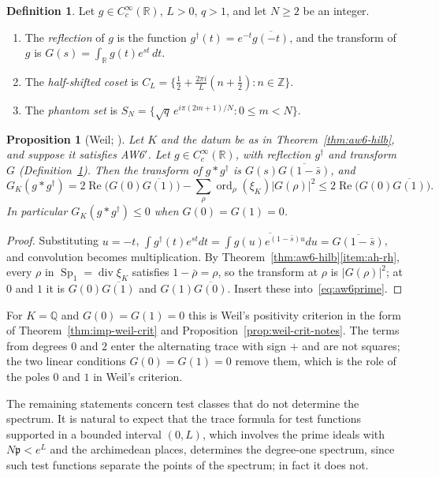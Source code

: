 \documentclass[11pt]{amsart}
\theoremstyle{plain}
\newtheorem{proposition}[theorem]{Proposition}
\theoremstyle{definition}
\newtheorem{definition}[theorem]{Definition}
\theoremstyle{remark}
\numberwithin{equation}{section}
\newcommand{\R}{\mathbb{R}}
\newcommand{\Q}{\mathbb{Q}}
\newcommand{\Z}{\mathbb{Z}}
\DeclareMathOperator{\divisor}{div}
\DeclareMathOperator{\Rea}{Re}
\DeclareMathOperator{\ord}{ord}
\renewcommand{\Re}{\Rea}
\begin{document}
\begin{definition}\label{def:window-objects}
Let $g\in C_c^\infty(\R)$, $L>0$, $q>1$, and let $N\ge2$ be an integer.
\begin{enumerate}[label=(\alph*)]
\item The \emph{reflection} of $g$ is the function
  $g^\dagger(t)=e^{-t}\overline{g(-t)}$, and the transform of $g$ is
  $G(s)=\int_\R g(t)e^{st}\,dt$.
\item The \emph{half-shifted coset} is
  $C_L=\{\tfrac12+\tfrac{2\pi i}L(n+\tfrac12):n\in\Z\}$.
\item The \emph{phantom set} is
  $S_N=\{\sqrt q\,e^{i\pi(2m+1)/N}:0\le m<N\}$.
\end{enumerate}
\end{definition}

\begin{proposition}[{Weil; \cite[\S V, p.~9]{Bombieri2000Clay}}]%
\label{prop:aw6-weil-pos}
Let $K$ and the datum be as in Theorem~\ref{thm:aw6-hilb}, and suppose
it satisfies AW6$'$. Let $g\in C_c^\infty(\R)$, with reflection
$g^\dagger$ and transform $G$ (Definition~\ref{def:window-objects}).
Then the transform of $g*g^\dagger$ is $G(s)\overline{G(1-\bar s)}$,
and
\[
G_K(g*g^\dagger)=2\Re\bigl(G(0)\overline{G(1)}\bigr)
-\sum_\rho\ord_\rho(\xi_K)|G(\rho)|^2
\le2\Re\bigl(G(0)\overline{G(1)}\bigr).
\]
In particular $G_K(g*g^\dagger)\le0$ when $G(0)=G(1)=0$.
\end{proposition}

\begin{proof}
Substituting $u=-t$, $\int g^\dagger(t)e^{st}dt=\overline{\int
g(u)e^{(1-\bar s)u}du}=\overline{G(1-\bar s)}$, and convolution becomes
multiplication. By Theorem~\ref{thm:aw6-hilb}\ref{item:ah-rh}, every
$\rho$ in $\operatorname{Sp}_1=\divisor\xi_K$ satisfies
$1-\bar\rho=\rho$, so the transform at $\rho$ is $|G(\rho)|^2$; at $0$
and $1$ it is $G(0)\overline{G(1)}$ and $G(1)\overline{G(0)}$.
Insert these into~\eqref{eq:aw6prime}.
\end{proof}

For $K=\Q$ and $G(0)=G(1)=0$ this is Weil's positivity criterion in the
form of Theorem~\ref{thm:imp-weil-crit} and
Proposition~\ref{prop:weil-crit-notes}. The terms from degrees $0$ and
$2$ enter the alternating trace with sign $+$ and are not squares; the
two linear conditions $G(0)=G(1)=0$ remove them, which is the role of
the poles $0$ and $1$ in Weil's criterion.

\medskip
The remaining statements concern test classes that do not determine
the spectrum. It is natural to expect that the trace formula for test
functions supported in a bounded interval $(0,L)$, which involves the
prime ideals with $N\mathfrak p<e^L$ and the archimedean places,
determines the degree-one spectrum, since such test functions separate
the points of the spectrum; in fact it does not.
\end{document}

